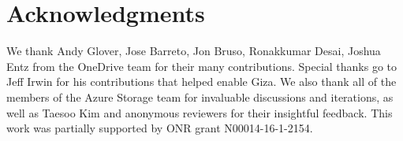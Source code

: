 
\section*{Acknowledgments}

We thank Andy Glover, Jose Barreto, Jon Bruso, Ronakkumar Desai, Joshua Entz
from the OneDrive team for their many contributions. Special thanks go to Jeff
Irwin for his contributions that helped enable Giza. We also thank all of the
members of the Azure Storage team for invaluable discussions and iterations, as
well as Taesoo Kim and anonymous reviewers for their insightful feedback. This
work was partially supported by ONR grant N00014-16-1-2154.

